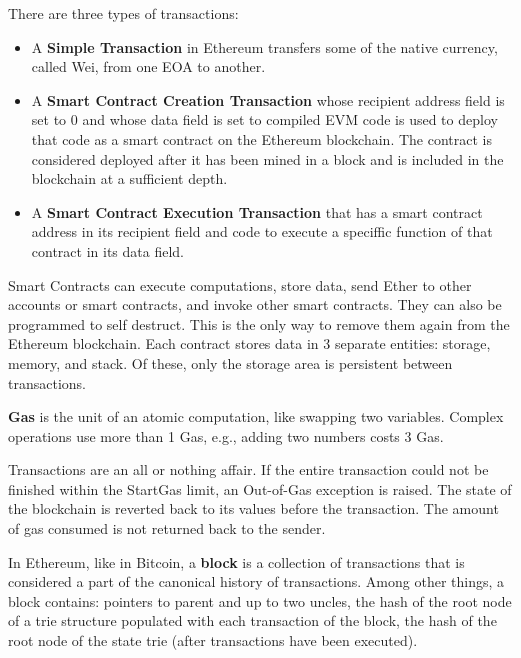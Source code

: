 There are three types of transactions:
\begin{itemize}
	\item A \textbf{Simple Transaction} in Ethereum transfers some of the native currency, called Wei, from one EOA to another.
	\item A \textbf{Smart Contract Creation Transaction} whose recipient address field is set to 0 and whose data field is set to compiled EVM code is used to deploy that code as a smart contract on the Ethereum blockchain. The contract is considered deployed after it has been mined in a block and is included in the blockchain at a sufficient depth.
	\item A \textbf{Smart Contract Execution Transaction} that has a smart contract address in its recipient field and code to execute a speciffic function of that contract in its data field.
\end{itemize}

Smart Contracts can execute computations, store data, send Ether to other accounts or smart contracts, and invoke other smart contracts. They can also be programmed to self destruct. This is the only way to remove them again from the Ethereum blockchain. Each contract stores data in 3 separate entities: storage, memory, and stack. Of these, only the storage area is persistent between transactions. \medskip

\textbf{Gas} is the unit of an atomic computation, like swapping two variables. Complex operations use more than 1 Gas, e.g., adding two numbers costs 3 Gas. \medskip

Transactions are an all or nothing affair. If the entire transaction could not be finished within the StartGas limit, an Out-of-Gas exception is raised. The state of the blockchain is reverted back to its values before the transaction. The amount of gas consumed is not returned back to the sender. \medskip

In Ethereum, like in Bitcoin, a \textbf{block} is a collection of transactions that is considered a part of the canonical history of transactions. Among other things, a block contains: pointers to parent and up to two uncles, the hash of the root node of a trie structure populated with each transaction of the block, the hash of the root node of the state trie (after transactions have been executed).
